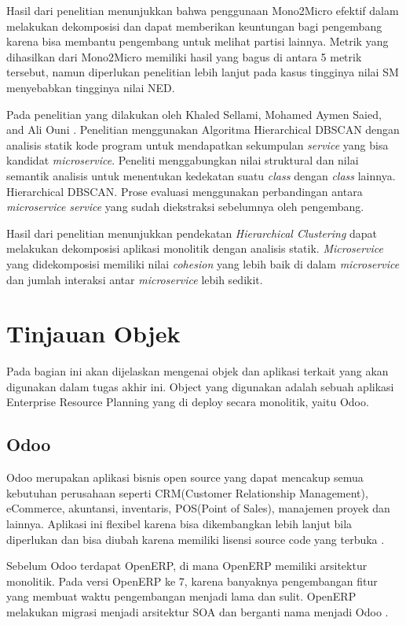 Hasil dari penelitian menunjukkan bahwa penggunaan Mono2Micro efektif dalam melakukan dekomposisi dan dapat memberikan keuntungan bagi pengembang karena bisa membantu pengembang untuk melihat partisi lainnya. Metrik yang dihasilkan dari Mono2Micro memiliki hasil yang bagus di antara 5 metrik tersebut, namun diperlukan penelitian lebih lanjut pada kasus tingginya nilai SM menyebabkan tingginya nilai NED.

Pada penelitian yang dilakukan oleh Khaled Sellami, Mohamed Aymen Saied, and Ali Ouni \cite{ECD}. Penelitian menggunakan Algoritma Hierarchical DBSCAN dengan analisis statik kode program untuk mendapatkan sekumpulan \textit{service} yang bisa kandidat \textit{microservice}.  Peneliti menggabungkan nilai struktural dan nilai semantik analisis untuk menentukan kedekatan suatu \textit{class} dengan \textit{class} lainnya.
Hierarchical DBSCAN. Prose evaluasi menggunakan perbandingan antara \textit{microservice} \textit{service} yang sudah diekstraksi sebelumnya oleh pengembang. 

Hasil dari penelitian menunjukkan pendekatan \textit{Hierarchical Clustering} dapat melakukan dekomposisi aplikasi monolitik dengan analisis statik. \textit{Microservice} yang didekomposisi memiliki nilai \textit{cohesion} yang lebih baik di dalam \textit{microservice} dan  jumlah interaksi antar \textit{microservice} lebih sedikit.
\\

\section{Tinjauan Objek}
Pada bagian ini akan dijelaskan mengenai objek dan aplikasi terkait yang akan digunakan dalam tugas akhir ini. Object yang digunakan adalah sebuah aplikasi Enterprise Resource Planning yang di deploy secara monolitik, yaitu Odoo.

\subsection{Odoo}
Odoo merupakan aplikasi bisnis open source yang dapat mencakup semua kebutuhan perusahaan seperti CRM(Customer Relationship Management), eCommerce, akuntansi, inventaris, POS(Point of Sales), manajemen proyek dan lainnya. Aplikasi ini flexibel karena bisa dikembangkan lebih lanjut bila diperlukan dan bisa diubah karena memiliki lisensi source code yang terbuka \cite{odoo}. 

Sebelum Odoo terdapat OpenERP, di mana OpenERP memiliki arsitektur monolitik. Pada versi OpenERP ke 7, karena banyaknya pengembangan fitur yang membuat waktu pengembangan menjadi lama dan sulit. OpenERP melakukan migrasi menjadi arsitektur SOA dan berganti nama menjadi Odoo \cite{5FA}.

